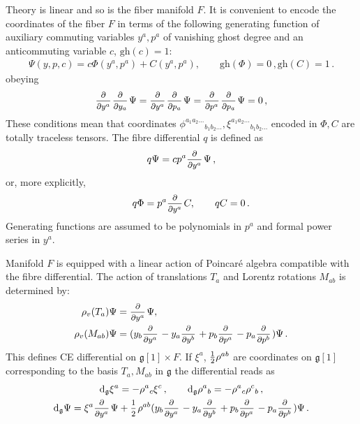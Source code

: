 \documentclass[a4paper,12pt]{article}
\numberwithin{equation}{section} %
\newcommand{\gh}[1]{\mathrm{gh}(#1)}
\renewcommand{\d}{\partial}
\newcommand{\half}{\mathchoice{%
    \ffrac{1}{2}}{\frac{1}{2}}{\frac{1}{2}}{\frac{1}{2}}}
\newcommand{\ffrac}[2]{\raisebox{.5pt}%
  {\footnotesize$\displaystyle\frac{#1}{#2}$}\kern1pt}
\newcommand{\ddl}[2]{\ffrac{\d #1}{\d #2}}
\newcommand{\Liealg}{\mathfrak}
\newcommand{\algg}{\Liealg{g}}
\newcommand{\dg}{\mathrm{d}_\algg}
\begin{document}
Theory is linear and so is the fiber manifold $F$. It is convenient to encode the coordinates of the fiber $F$ in terms of the following generating function of auxiliary commuting variables $y^a, p^a$ of vanishing ghost degree and an anticommuting variable $c$, $\gh{c}=1$:
\begin{equation}
    \begin{gathered}
       \Psi(y,p,c)= c\Phi(y^a,p^a)+ C(y^a, p^a) , \qquad \gh{\Phi} = 0\,, \gh{C} = 1 \,.
    \end{gathered}
\end{equation}
obeying 
\begin{equation}
\begin{gathered}
    \ddl{}{y^a}\ddl{}{y_a} \Psi = \ddl{}{y^a}\ddl{}{p_a} \Psi = \ddl{}{p^a}\ddl{}{p_a} \Psi = 0\,, 
\end{gathered}
\end{equation}
These conditions mean that coordinates $\phi^{a_1 a_2...}{ }_{b_1 b_2...}, \xi^{a_1 a_2...}{ }_{b_1 b_2...}$ encoded in $\Phi,C$ are totally traceless tensors. The fibre differential $q$ is defined as 
\begin{equation}
    q\Psi = cp^a\ddl{}{y^a}\Psi\,, 
\end{equation}
or, more explicitly,
\begin{equation}
    \qquad q\Phi = p^a\ddl{}{y^a}C, \qquad qC = 0\,.
\end{equation}
Generating functions are assumed to be polynomials in $p^a$ and formal power series in $y^a$. 


Manifold $F$ is equipped with a linear action of Poincar\'e algebra compatible with the fibre differential. The action of translations $T_a$ and Lorentz rotations $M_{ab}$ is determined by: 
\begin{equation}
\begin{aligned}
\rho_v(T_a)\Psi &= \ddl{}{y^a}\Psi, \\%
\rho_v(M_{ab})\Psi&=(y_b\ddl{}{y^a}-y_a\ddl{}{y^b} + p_b \ddl{}{p^a}-p_a \ddl{}{p^b})\Psi\,.
\end{aligned}
\end{equation}
This defines CE differential on $\algg[1]\times F$. If $\xi^a$, $\half \rho^{ab}$ are coordinates on $\algg[1]$
corresponding to the basis $T_a,M_{ab}$ in $\algg$ the differential reads as
\begin{equation} 
\begin{gathered}
    \dg\xi^a = -\rho^{a}{ }_c\xi^c \,, \qquad 
    \dg\rho^{a}{ }_b = -\rho^{a}{ }_c \rho^{c}{ }_b\,, \\
    \dg\Psi=\xi^a \ddl{}{y^a}\Psi + \half \rho^{ab}(y_b\ddl{}{y^a}-y_a\ddl{}{y^b} + p_b \ddl{}{p^a}-p_a \ddl{}{p^b})\Psi \,.
\end{gathered}
\end{equation}
\end{document}
